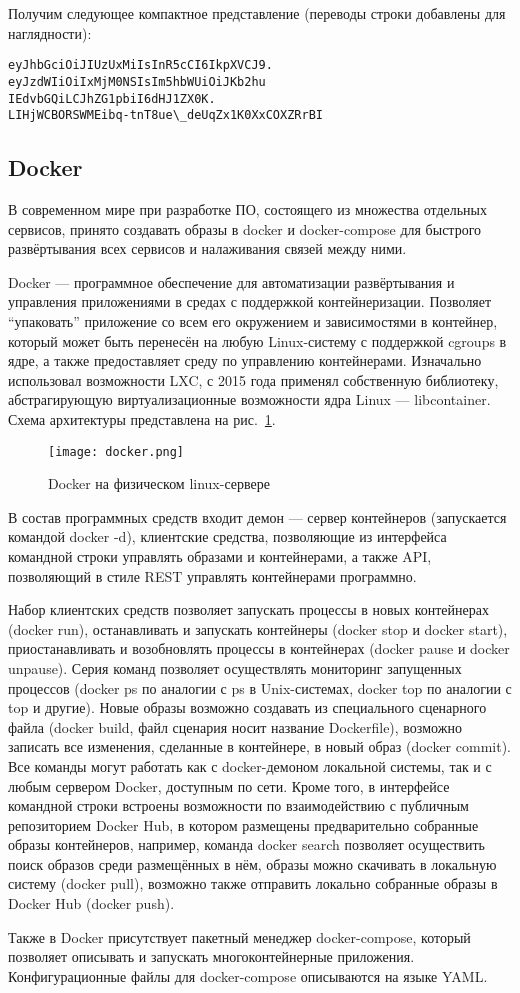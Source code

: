 Получим следующее компактное представление (переводы строки добавлены для наглядности):

\begin{lstlisting}
eyJhbGciOiJIUzUxMiIsInR5cCI6IkpXVCJ9.
eyJzdWIiOiIxMjM0NSIsIm5hbWUiOiJKb2hu
IEdvbGQiLCJhZG1pbiI6dHJ1ZX0K.
LIHjWCBORSWMEibq-tnT8ue\_deUqZx1K0XxCOXZRrBI
\end{lstlisting}

\subsection{Docker}

В современном мире при разработке ПО, состоящего из множества отдельных сервисов, принято создавать образы в docker и docker-compose для быстрого развёртывания всех сервисов и налаживания связей между ними.

Docker — программное обеспечение для автоматизации развёртывания и управления приложениями в средах с поддержкой контейнеризации. Позволяет ``упаковать'' приложение со всем его окружением и зависимостями в контейнер, который может быть перенесён на любую Linux-систему с поддержкой cgroups в ядре, а также предоставляет среду по управлению контейнерами. Изначально использовал возможности LXC, с 2015 года применял собственную библиотеку, абстрагирующую виртуализационные возможности ядра Linux — libcontainer. Схема архитектуры представлена на рис.~\ref{fig:docker}.

\begin{figure}[ht]
    \centering
    \texttt{[image: docker.png]}
    \caption{Docker на физическом linux-сервере}\label{fig:docker}
\end{figure}

В состав программных средств входит демон — сервер контейнеров (запускается командой docker -d), клиентские средства, позволяющие из интерфейса командной строки управлять образами и контейнерами, а также API, позволяющий в стиле REST управлять контейнерами программно.

Набор клиентских средств позволяет запускать процессы в новых контейнерах (docker run), останавливать и запускать контейнеры (docker stop и docker start), приостанавливать и возобновлять процессы в контейнерах (docker pause и docker unpause). Серия команд позволяет осуществлять мониторинг запущенных процессов (docker ps по аналогии с ps в Unix-системах, docker top по аналогии с top и другие). Новые образы возможно создавать из специального сценарного файла (docker build, файл сценария носит название Dockerfile), возможно записать все изменения, сделанные в контейнере, в новый образ (docker commit). Все команды могут работать как с docker-демоном локальной системы, так и с любым сервером Docker, доступным по сети. Кроме того, в интерфейсе командной строки встроены возможности по взаимодействию с публичным репозиторием Docker Hub, в котором размещены предварительно собранные образы контейнеров, например, команда docker search позволяет осуществить поиск образов среди размещённых в нём, образы можно скачивать в локальную систему (docker pull), возможно также отправить локально собранные образы в Docker Hub (docker push).


Также в Docker присутствует пакетный менеджер docker-compose, который позволяет описывать и запускать многоконтейнерные приложения. Конфигурационные файлы для docker-compose описываются на языке YAML.
